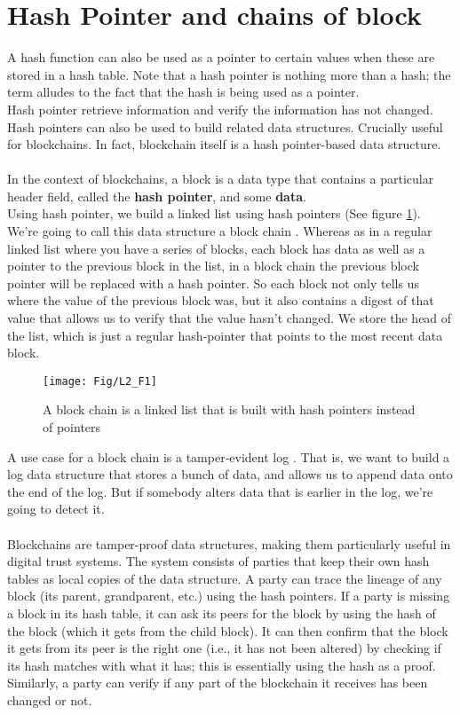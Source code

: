 \section{Hash Pointer and chains of block}
A hash function can also be used as a pointer to certain values when these are stored in a hash table. Note that a hash pointer is nothing more than a hash; the term alludes to the fact that the hash is being used as a pointer.\\
Hash pointer retrieve information and verify the information has not changed. Hash pointers can also be used to build related data structures. Crucially useful for blockchains. In fact, blockchain itself is a hash pointer-based data structure. \\\\
In the context of blockchains, a block is a data type that contains a particular header field, called the \textbf{hash pointer}, and some \textbf{data}.\\
Using hash pointer, we build a linked list using hash pointers (See figure \ref{fig:l2_f1}). We’re going to call this data structure a block chain . Whereas as in a regular linked list where you have a series of blocks, each block has data as well as a pointer to the previous block in the list, in a block chain the previous block pointer will be replaced with a hash pointer. So each block not only tells us where the value of the previous block was, but it also contains a digest of that value that allows us to verify that the value hasn’t changed. We store the head of the list, which is just a regular hash‐pointer that points to the most recent data block.
\begin{center}
	\begin{figure}
		\centering
		\texttt{[image: Fig/L2\_F1]}
		\caption{A block chain is a linked list that is built with hash pointers instead of pointers}
		\label{fig:l2_f1}
	\end{figure}
\end{center}
A use case for a block chain is a tamper‐evident log . That is, we want to build a log data structure that stores a bunch of data, and allows us to append data onto the end of the log. But if somebody alters data that is earlier in the log, we’re going to detect it.\\\\
Blockchains are tamper-proof data structures, making them particularly useful in digital trust systems. The system consists of parties that keep their own hash tables as local copies of the data structure. A party can trace the lineage of any block (its parent, grandparent, etc.) using the hash pointers. If a party is missing a block in its hash table, it can ask its peers for the block by using the hash of the block (which it gets from the child block). It can then confirm that the block it gets from its peer is the right one (i.e., it has not been altered) by checking if its hash matches with what it has; this is essentially using the hash as a proof. Similarly, a party can verify if any part of the blockchain it receives has been changed or not.\\
